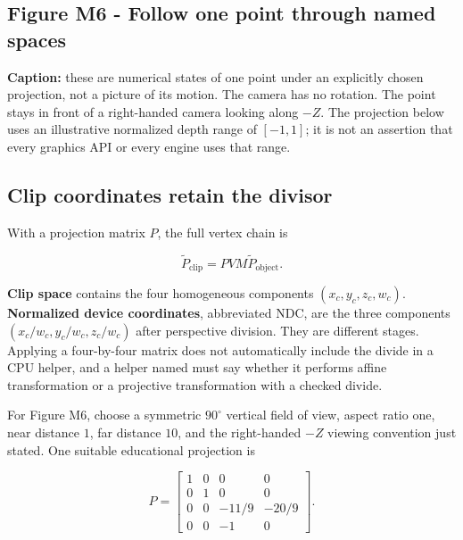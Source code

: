\subsection{Figure M6 - Follow one point through named spaces}\label{01-foundations-i-ch019-figure-m6---follow-one-point-through-named-spaces}

\hypertarget{01-foundations-i-ch019-figure-m6---follow-one-point-through-named-spaces}{}


\textbf{Caption:} these are numerical states of one point under an explicitly chosen projection, not a picture of its motion. The camera has no rotation. The point stays in front of a right-handed camera looking along \(-Z\). The projection below uses an illustrative normalized depth range of \([-1,1]\); it is not an assertion that every graphics API or every engine uses that range.

\subsection{Clip coordinates retain the divisor}\label{01-foundations-i-ch019-clip-coordinates-retain-the-divisor}

\hypertarget{01-foundations-i-ch019-clip-coordinates-retain-the-divisor}{}

With a projection matrix \(P\), the full vertex chain is

\[
\widetilde P_{\mathrm{clip}}=PVM\widetilde P_{\mathrm{object}}.
\]

\textbf{Clip space} contains the four homogeneous components \((x_c,y_c,z_c,w_c)\). \textbf{Normalized device coordinates}, abbreviated NDC, are the three components \((x_c/w_c,y_c/w_c,z_c/w_c)\) after perspective division. They are different stages. Applying a four-by-four matrix does not automatically include the divide in a CPU helper, and a helper named  must say whether it performs affine transformation or a projective transformation with a checked divide.

For Figure M6, choose a symmetric \(90^\circ\) vertical field of view, aspect ratio one, near distance \(1\), far distance \(10\), and the right-handed \(-Z\) viewing convention just stated. One suitable educational projection is

\[
P=\begin{bmatrix}
1&0&0&0\\
0&1&0&0\\
0&0&-11/9&-20/9\\
0&0&-1&0
\end{bmatrix}.
\]

